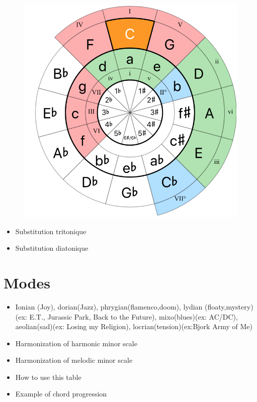 \documentclass{article}
\begin{document}
\begin{figure}[h!]
	\centering
	\hspace*{-1cm}
	\includegraphics[scale=0.3, trim= {0cm 0cm 0cm 0cm}, clip]{Circle_5th.png}
	\caption{ }
	\label{fig}
\end{figure}

\begin{itemize}
	\item Substitution tritonique
	\item Substitution diatonique
\end{itemize}

\newpage
\section{Modes}

\begin{itemize}
	\item Ionian (Joy), dorian(Jazz), phrygian(flamenco,doom), lydian (floaty,mystery) (ex: E.T., Jurassic Park, Back to the Future), mixo(blues)(ex: AC/DC), aeolian(sad)(ex: Losing my Religion), locrian(tension)(ex:Bjork Army of Me)
	\item Harmonization of harmonic minor scale
	\item Harmonization of melodic minor scale
	\item How to use this table
	\item Example of chord progression
\end{itemize}
\end{document}
